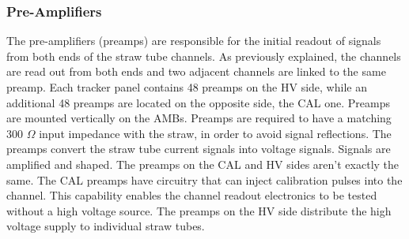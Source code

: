 \subsubsection{Pre-Amplifiers}\label{preampss}
The pre-amplifiers (preamps) are responsible for the initial readout of 
signals from both ends of the straw tube channels. As previously explained, 
the channels are read out from both ends and two adjacent channels are linked 
to the same preamp. Each tracker panel contains 48 preamps on the HV side, 
while an additional 48 preamps are located on the opposite side, the CAL one. 
Preamps are mounted vertically on the AMBs. Preamps are required to have a 
matching 300 $\Omega$ input impedance with the straw, in order to avoid signal 
reflections. The preamps convert the straw tube current signals into voltage signals. 
Signals are amplified and shaped. The preamps on the CAL and HV sides aren't 
exactly the same. The CAL preamps have circuitry that can inject calibration 
pulses into the channel. This capability enables the channel readout electronics 
to be tested without a high voltage source. The preamps on the HV side distribute 
the high voltage supply to individual straw tubes. 
